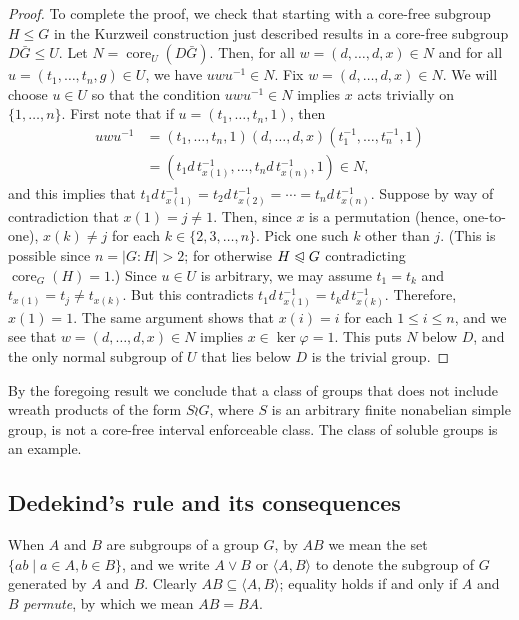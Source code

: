 \documentclass{gen-j-l}
\newcommand{\<}{\ensuremath{\langle}}
\renewcommand{\>}{\ensuremath{\rangle}}
\theoremstyle{plain}
\theoremstyle{definition}
\theoremstyle{remark}
\numberwithin{theorem}{section}
\numberwithin{claim}{section}
\numberwithin{equation}{section}
\numberwithin{conjecture}{section}
\renewcommand{\leq}{\ensuremath{\leqslant}}
\newcommand{\subnormal}{\ensuremath{\trianglelefteqslant}}
\newcommand{\join}{\ensuremath{\vee}}
\newcommand{\core}{\ensuremath{\operatorname{core}}}
\newcommand{\2}{\ensuremath{\mathbf{2}}}
\newcommand{\3}{\ensuremath{\mathbf{3}}}
\renewcommand{\phi}{\ensuremath{\varphi}}
\begin{document}
\begin{proof}
  To complete the proof, we check that starting with a core-free subgroup
  $H \leq G$ in the Kurzweil construction just described results in a
  core-free subgroup $D \bar{G} \leq U$.   Let $N = \core_U(D\bar{G})$.  Then, for all $w=(d,\dots, d, x) \in N$ and for all 
  $u = (t_1,\dots, t_n, g)\in U$, we have $u w u^{-1}\in N$. 
  Fix $w=(d,\dots, d, x) \in N$.  We will choose $u\in U$ so that
  the condition $u w u^{-1}\in N$ implies $x$ acts trivially on $\{1, \dots, n\}$.
  First note that if $u = (t_1,\dots, t_n, 1)$, then
  \begin{align*}
  u w u^{-1} &= (t_1,\dots, t_n, 1) (d, \dots, d, x) (t_1^{-1},\dots, t_n^{-1}, 1)\\
  &=(t_1 d \,t_{x(1)}^{-1},\dots, t_nd \,t_{x(n)}^{-1}, 1) \in N,
  \end{align*}
  and this implies that $t_1 d\, t_{x(1)}^{-1} = t_2 d\, t_{x(2)}^{-1} =\cdots = t_nd \,t_{x(n)}^{-1}$. 
  Suppose by way of contradiction that $x(1) = j\neq 1$.  Then, since $x$ is a
  permutation (hence, one-to-one), $x(k) \neq j$ for
  each $k\in \{2, 3, \dots, n\}$.  Pick one such $k$ other than $j$.
  (This is possible since $n = |G:H|>2$; for otherwise $H\subnormal G$
  contradicting $\core_G(H)=1$.) 
  Since $u \in U$ is arbitrary, we may assume
  $t_1 = t_k$ and $t_{x(1)}=t_j\neq t_{x(k)}$.  
  But this contradicts $t_1 d\, t_{x(1)}^{-1} = t_k d\, t_{x(k)}^{-1}$.
  Therefore, $x(1) = 1$.  The same argument shows that 
  $x(i) = i$ for each $1\leq i\leq n$, 
  and we see that
  $w=(d,\dots,d, x) \in N$ implies $x\in \ker \phi = 1$.  This puts $N$ below
  $D$, and the only normal subgroup of $U$ that lies 
  below $D$ is the trivial group.
\end{proof}
By the foregoing result we conclude that a class of groups that does
not include wreath products of the form $S\wr G$, where $S$ is an arbitrary
finite nonabelian simple group, is not a core-free interval enforceable class. 
The class of soluble groups is an example.




\subsection{Dedekind's rule and its consequences}
\label{sec:dedekinds-rule}
When $A$ and $B$ are subgroups of a group $G$, by $AB$ we mean the set
$\{ a b \mid a\in A, b\in B\}$, and we write $A \join B$ or $\<A, B\>$ to denote
the subgroup of $G$ generated by $A$ and $B$.  
Clearly $AB \subseteq \<A,B\>$; 
equality holds if and only if $A$ and $B$ \emph{permute}, by which we mean $A B = B A$.
\end{document}
